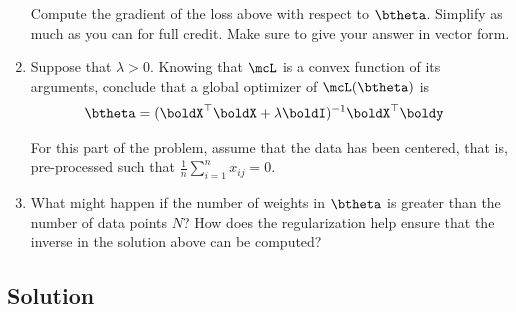 \documentclass[submit]{harvardml}
\begin{document}
\begin{problem}
\begin{enumerate}
Compute the gradient of the loss above with respect to $\btheta$.
Simplify as much as you can for full credit.  Make sure to give your
answer in vector form.

\item Suppose that $\lambda > 0$. Knowing that $\mcL$ is a convex function
    of its arguments, conclude that a global optimizer of
    $\mcL(\btheta)$ is
    \begin{align}
      \btheta &= (\boldX^\top \boldX + \lambda \boldI)^{-1} \boldX^\top \boldy
    \end{align}

For this part of the problem, assume that the data has been centered,
that is, pre-processed such that $\frac{1}{n} \sum_{i=1}^n x_{ij} = 0
$.

\item What might happen if the number of weights in $\btheta$ is
  greater than the number of data points $N$?  How does the
  regularization help ensure that the inverse in the solution above
  can be computed?  

\end{enumerate}

\end{problem}

\subsection*{Solution}



\newpage
\end{document}
